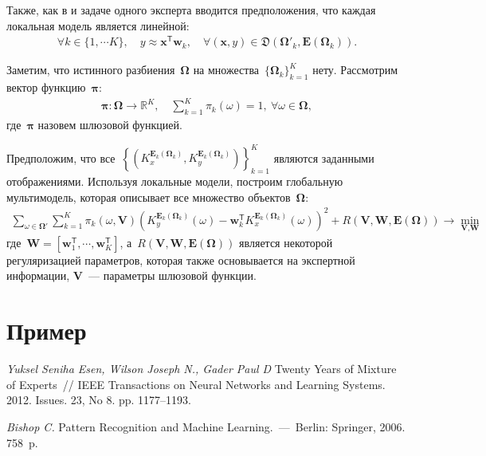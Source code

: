 \documentclass[12pt, twoside]{article}
\numberwithin{equation}{section}
\begin{document}
Также, как в и задаче одного эксперта вводится предположения, что каждая локальная модель является линейной:
\begin{equation}
\label{eq:st:7}
\begin{aligned}
\forall k\in\{1,\cdots K\}, \quad y \approx \textbf{x}^{\mathsf{T}}\textbf{w}_k, \quad \forall\left(\textbf{x}, y\right)\in\mathfrak{D}\left(\bm{\Omega}'_{k},\bm{E}\left(\bm{\Omega}_k\right)\right).
\end{aligned}
\end{equation}

Заметим, что истинного разбиения~$\bm{\Omega}$ на множества~$\{\bm{\Omega}_k\}_{k=1}^{K}$ нету. Рассмотрим вектор функцию~$\bm{\pi}$:
\begin{equation}
\label{eq:st:8}
\begin{aligned}
\bm{\pi}:\bm{\Omega}\to \mathbb{R}^{K}, \quad \sum_{k=1}^{K}\pi_{k}\left(\omega\right)=1,~\forall\omega\in\bm{\Omega},
\end{aligned}
\end{equation}
где~$\bm{\pi}$ назовем шлюзовой функцией.

Предположим, что все~$\left\{\left(K_x^{\bm{E}_k\left(\bm{\Omega}_k\right)}, K_y^{\bm{E}_k\left(\bm{\Omega}_k\right)}\right)\right\}_{k=1}^{K}$ являются заданными отображениями. Используя локальные модели, построим глобальную мультимодель, которая описывает все множество объектов~$\bm{\Omega}$:
\begin{equation}
\label{eq:st:9}
\begin{aligned}
\sum_{\omega \in \bm{\Omega}'}\sum_{k=1}^{K}\pi_{k}\left(\omega, \textbf{V}\right)\left(K_y^{\bm{E}_k\left(\bm{\Omega}_k\right)}\left(\omega\right) - \textbf{w}_{k}^{\mathsf{T}}K_x^{\bm{E}_k\left(\bm{\Omega}_k\right)}\left(\omega\right) \right)^2 + R\left(\textbf{V}, \textbf{W}, \bm{E}\left(\bm{\Omega}\right)\right) \to \min_{\textbf{V}, \textbf{W}}
\end{aligned}
\end{equation}
где~$\textbf{W}=[\textbf{w}_1^\mathsf{T}, \cdots, \textbf{w}_K^{\mathsf{T}}]$, а~$R\left(\textbf{V}, \textbf{W}, \bm{E}\left(\bm{\Omega}\right)\right)$ является некоторой регуляризацией параметров, которая также основывается на экспертной информации, $\textbf{V}$~--- параметры шлюзовой функции.

\section{Пример}

\begin{thebibliography}{99}
	\textit{Yuksel Seniha Esen, Wilson Joseph N., Gader Paul D} Twenty Years of Mixture of Experts~// IEEE Transactions on Neural Networks and Learning Systems. 2012. Issues. 23, No 8. pp. 1177--1193.
		
	\textit{Bishop C.} Pattern Recognition and Machine Learning.~---~Berlin: Springer, 2006. 758~p.
 \end{thebibliography}
\end{document}
